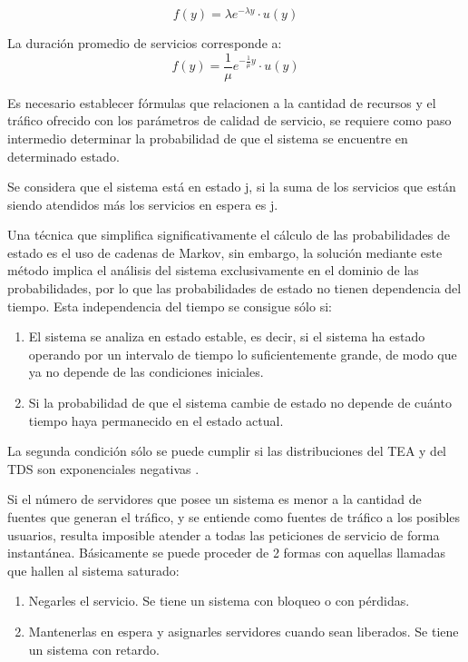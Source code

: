 \begin{equation}
f(y)=\lambda e^{-\lambda y}\cdot u(y)
\label{eqn:lambda}
\end{equation}

La duración promedio de servicios corresponde a:
\begin{equation}
f(y)=\frac{1}{\mu } e^{-\frac{1}{\mu} y} \cdot u(y)
\label{eqn:mu}
\end{equation} 

Es necesario establecer fórmulas que relacionen a la cantidad de recursos y el tráfico ofrecido con los parámetros de calidad de servicio, se requiere como paso intermedio determinar la probabilidad de que el sistema se encuentre en determinado estado.\newline

Se considera que el sistema está en estado j, si la suma de los servicios que están siendo atendidos más los servicios en espera es j.\newline

Una técnica que simplifica significativamente el cálculo de las probabilidades de estado es el uso de cadenas de Markov, sin embargo, la solución mediante este método implica el análisis del sistema exclusivamente en el dominio de las probabilidades, por lo que las probabilidades de estado no tienen dependencia del tiempo. Esta independencia del tiempo se consigue sólo si:

\begin{enumerate}
\item  El sistema se analiza en estado estable, es decir, si el sistema ha estado operando por un intervalo de tiempo lo suficientemente grande, de modo que ya no depende de las condiciones iniciales.
\item  Si la probabilidad de que el sistema cambie de estado no depende de cuánto tiempo haya permanecido en el estado actual.
\end{enumerate}

 La segunda condición sólo se puede cumplir si las distribuciones del TEA y del TDS son exponenciales negativas \parencite{Carter1990}.\newline

 Si el número de servidores que posee un sistema es menor a la cantidad de fuentes que generan el tráfico, y se entiende como fuentes de tráfico a los posibles usuarios, resulta imposible atender a todas las peticiones de servicio de forma instantánea. Básicamente se puede proceder de 2 formas con aquellas llamadas que hallen al sistema saturado:
\begin{enumerate}
\item  Negarles el servicio. Se tiene un sistema con bloqueo o con pérdidas.
\item  Mantenerlas en espera y asignarles servidores cuando sean liberados. Se tiene un sistema con retardo.
\end{enumerate}

